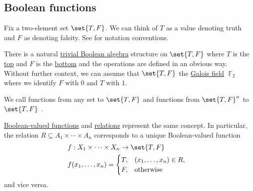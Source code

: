 \subsection{Boolean functions}\label{subsec:boolean_functions}

\begin{definition}\label{def:boolean_value}
  Fix a two-element set \( \set{ T, F } \). We can think of \( T \) as a value denoting truth and \( F \) as denoting falsity. See  for notation conventions.

  There is a natural \hyperref[def:boolean_algebra/trivial]{trivial Boolean algebra} structure on \( \set{ T, F } \) where \( T \) is the \hyperref[def:semilattice/join]{top} and \( F \) is the \hyperref[def:semilattice/meet]{bottom} and the operations are defined in an obvious way. Without further context, we can assume that \( \set{ T, F } \) the \hyperref[thm:galois_field_existence]{Galois field} \( \BbbF_2 \) where we identify \( F \) with \( 0 \) and \( T \) with \( 1 \).
\end{definition}

\begin{definition}\label{def:boolean_function}
  We call functions from any set to \( \set{ T, F } \)  and functions from \( \set{ T, F }^n \) to \( \set{ T, F } \) .
\end{definition}

\begin{remark}\label{rem:boolean_valued_functions_and_predicates}
  \hyperref[def:boolean_function]{Boolean-valued functions} and \hyperref[def:relation]{relations} represent the same concept. In particular, the relation \( R \subseteq A_1 \times \cdots \times A_n \) corresponds to a unique Boolean-valued function
  \begin{equation*}
    \begin{aligned}
      &f: X_1 \times \cdots \times X_n \to \set{ T, F } \\
      &f(x_1, \ldots, x_n) = \begin{cases}
        T, &(x_1, \ldots, x_n) \in R, \\
        F, &\T{otherwise}
      \end{cases}
    \end{aligned}
  \end{equation*}
  and vice versa.
\end{remark}

